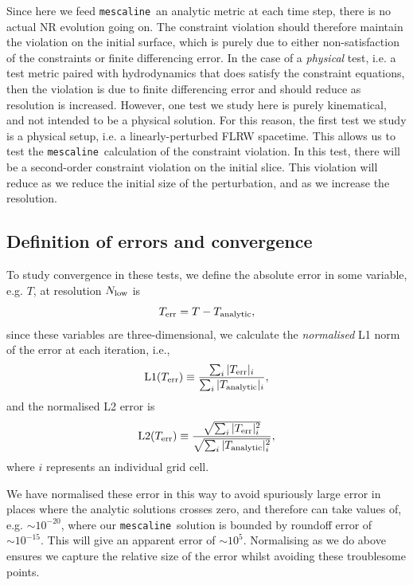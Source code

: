 \documentclass[a4paper]{article}
\newcommand{\mesc}{\texttt{mescaline}}
\begin{document}
Since here we feed \mesc\, an analytic metric at each time step, there is no actual NR evolution going on. The constraint violation should therefore maintain the violation on the initial surface, which is purely due to either non-satisfaction of the constraints or finite differencing error. In the case of a \emph{physical} test, i.e. a test metric paired with hydrodynamics that does satisfy the constraint equations, then the violation is due to finite differencing error and should reduce as resolution is increased. However, one test we study here is purely kinematical, and not intended to be a physical solution. For this reason, the first test we study is a physical setup, i.e. a linearly-perturbed FLRW spacetime. This allows us to test the \mesc\, calculation of the constraint violation. In this test, there will be a second-order constraint violation on the initial slice. This violation will reduce as we reduce the initial size of the perturbation, and as we increase the resolution. 


\subsection{Definition of errors and convergence} \label{sec:convergence_defs}

To study convergence in these tests, we define the absolute error in some variable, e.g. $T$, at resolution $N_{\rm low}$ is
\begin{equation}
	T_{\rm err} = T - T_{\rm analytic},
\end{equation}
since these variables are three-dimensional, we calculate the \emph{normalised} L1 norm of the error at each iteration, i.e.,
\begin{equation}\label{eq:L1normalised}
	{\rm L1}(T_{\rm err}) \equiv \frac{\sum_i |T_{\rm err} |_i}{\sum_i | T_{\rm analytic} |_i},
\end{equation}
and the normalised L2 error is
\begin{equation}\label{eq:L2normalised}
	{\rm L2}(T_{\rm err}) \equiv \frac{ \sqrt{\sum_i | T_{\rm err} |^2_i}}{\sqrt{ \sum_i | T_{\rm analytic} |^2_i}},
\end{equation}
where $i$ represents an individual grid cell. 

We have normalised these error in this way to avoid spuriously large error in places where the analytic solutions crosses zero, and therefore can take values of, e.g. $\sim 10^{-20}$, where our \mesc\, solution is bounded by roundoff error of $\sim 10^{-15}$. This will give an apparent error of $\sim 10^5$. Normalising as we do above ensures we capture the relative size of the error whilst avoiding these troublesome points.
\end{document}
